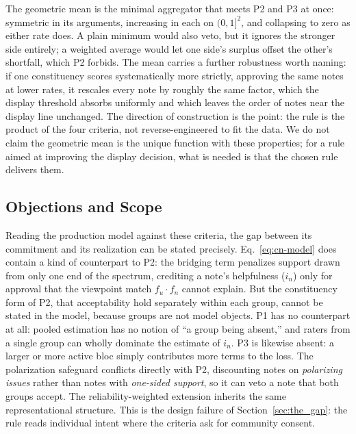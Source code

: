 \documentclass[10pt,twocolumn]{article}
\begin{document}
The geometric mean is the minimal aggregator that meets P2 and P3 at once:
symmetric in its arguments, increasing in each on $(0,1]^2$, and collapsing to
zero as either rate does. A plain minimum would also veto, but it ignores the
stronger side entirely; a weighted average would let one side's surplus offset
the other's shortfall, which P2 forbids. The mean carries a further robustness
worth naming: if one constituency scores systematically more strictly, approving
the same notes at lower rates, it rescales every note by roughly the same factor,
which the display threshold absorbs uniformly and which leaves the order of notes
near the display line unchanged. The direction of construction is the point: the rule is the product of the four criteria, not reverse-engineered to fit the data.
We do not claim the geometric mean is the unique function with these properties;
for a rule aimed at improving the display decision, what is needed is that the
chosen rule delivers them.

\subsection*{Objections and Scope}

Reading the production model against these criteria, the gap between its
commitment and its realization can be stated precisely. Eq.~\eqref{eq:cn-model}
does contain a kind of counterpart to P2: the bridging term penalizes support
drawn from only one end of the spectrum, crediting a note's helpfulness ($i_n$)
only for approval that the viewpoint match $f_u \cdot f_n$ cannot explain. But the
constituency form of P2, that acceptability hold separately within each group,
cannot be stated in the model, because groups are not model objects. P1 has no
counterpart at all: pooled estimation has no notion of ``a group being absent,''
and raters from a single group can wholly dominate the estimate of $i_n$. P3 is
likewise absent: a larger or more active bloc simply contributes more terms to the
loss. The polarization safeguard conflicts directly with P2, discounting notes on
\emph{polarizing issues} rather than notes with \emph{one-sided support}, so it
can veto a note that both groups accept. The reliability-weighted extension
\citep{goyal2026qsmf} inherits the same representational structure. This is the
design failure of Section~\ref{sec:the_gap}: the rule reads individual intent
where the criteria ask for community consent.
\end{document}
